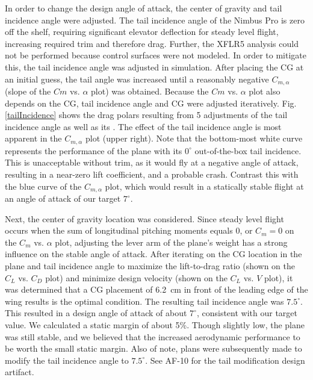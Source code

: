 \documentclass[]{auvsi_doc}
\begin{document}
In order to change the design angle of attack, the center of gravity and tail incidence angle were adjusted. The tail incidence angle of the Nimbus Pro is zero off the shelf, requiring significant elevator deflection for steady level flight, increasing required trim and therefore drag. Further, the XFLR5 analysis could not be performed because control surfaces were not modeled. In order to mitigate this, the tail incidence angle was adjusted in simulation. After placing the CG at an initial guess, the tail angle was increased until a reasonably negative $C_{m,\alpha}$ (slope of the $Cm$ vs. $\alpha$ plot) was obtained. Because the $Cm$ vs. $\alpha$ plot also depends on the CG, tail incidence angle and CG were adjusted iteratively. Fig. \ref{tailIncidence} shows the drag polars resulting from 5 adjustments of the tail incidence angle as well as its . The effect of the tail incidence angle is most apparent in the $C_{m,\alpha}$ plot (upper right). Note that the bottom-most white curve represents the performance of the plane with its $0^\circ$ out-of-the-box tail incidence. This is unacceptable without trim, as it would fly at a negative angle of attack, resulting in a near-zero lift coefficient, and a probable crash. Contrast this with the blue curve of the $C_{m,\alpha}$ plot, which would result in a statically stable flight at an angle of attack of our target $7^\circ$.

Next, the center of gravity location was considered. Since steady level flight occurs when the sum of longitudinal pitching moments equals 0, or $C_m = 0$ on the $C_m$ vs. $\alpha$ plot, adjusting the lever arm of the plane's weight has a strong influence on the stable angle of attack. After iterating on the CG location in the plane and tail incidence angle to maximize the lift-to-drag ratio (shown on the $C_L$ vs. $C_D$ plot) and minimize design velocity (shown on the $C_L$ vs. $V$ plot), it was determined that a CG placement of 6.2~cm in front of the leading edge of the wing results is the optimal condition. The resulting tail incidence angle was $7.5^\circ$. This resulted in a design angle of attack of about $7^\circ$, consistent with our target value. We calculated a static margin of about 5\%. Though slightly low, the plane was still stable, and we believed that the increased aerodynamic performance to be worth the small static margin. Also of note, plans were subsequently made to modify the tail incidence angle to $7.5^\circ$. See AF-10 for the tail modification design artifact.
\end{document}
